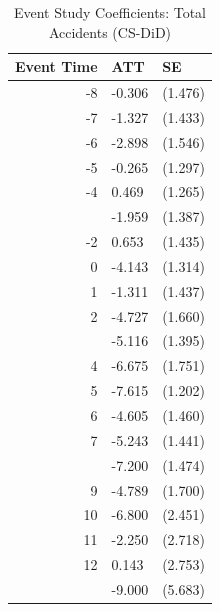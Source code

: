 \begin{table}[!h]
\centering
\caption{Event Study Coefficients: Total Accidents (CS-DiD)}
\centering
\begin{tabular}[t]{rll}
\toprule
Event Time & ATT & SE\\
\midrule
-8 & -0.306 & (1.476)\\
-7 & -1.327 & (1.433)\\
-6 & -2.898 & (1.546)\\
-5 & -0.265 & (1.297)\\
-4 & 0.469 & (1.265)\\
\addlinespace
-3 & -1.959 & (1.387)\\
-2 & 0.653 & (1.435)\\
0 & -4.143 & (1.314)\\
1 & -1.311 & (1.437)\\
2 & -4.727 & (1.660)\\
\addlinespace
3 & -5.116 & (1.395)\\
4 & -6.675 & (1.751)\\
5 & -7.615 & (1.202)\\
6 & -4.605 & (1.460)\\
7 & -5.243 & (1.441)\\
\addlinespace
8 & -7.200 & (1.474)\\
9 & -4.789 & (1.700)\\
10 & -6.800 & (2.451)\\
11 & -2.250 & (2.718)\\
12 & 0.143 & (2.753)\\
\addlinespace
13 & -9.000 & (5.683)\\
\bottomrule
\end{tabular}
\end{table}
